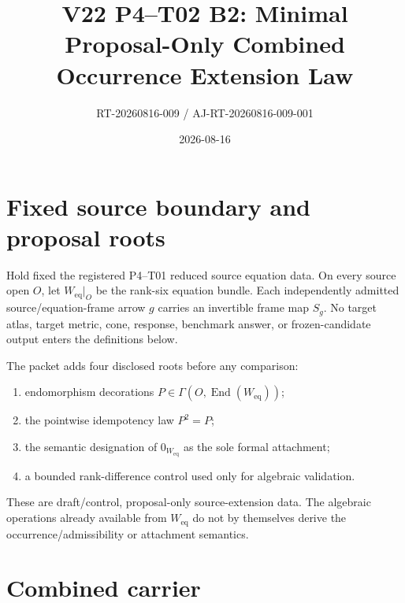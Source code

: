 \documentclass[11pt]{article}
\title{V22 P4--T02 B2: Minimal Proposal-Only Combined Occurrence Extension Law}
\author{RT-20260816-009 / AJ-RT-20260816-009-001}
\date{2026-08-16}
\newcommand{\Weq}{W_{\mathrm{eq}}}
\begin{document}
\maketitle

\begin{center}
\end{center}

\section{Fixed source boundary and proposal roots}

Hold fixed the registered P4--T01 reduced source equation data. On every source
open $O$, let $\Weq|_O$ be the rank-six equation bundle. Each independently
admitted source/equation-frame arrow $g$ carries an invertible frame map $S_g$.
No target atlas, target metric, cone, response, benchmark answer, or
frozen-candidate output enters the definitions below.

The packet adds four disclosed roots before any comparison:
\begin{enumerate}
\item endomorphism decorations $P\in\Gamma(O,\operatorname{End}(\Weq))$;
\item the pointwise idempotency law $P^2=P$;
\item the semantic designation of $0_{\Weq}$ as the sole formal attachment;
\item a bounded rank-difference control used only for algebraic validation.
\end{enumerate}
These are draft/control, proposal-only source-extension data. The algebraic
operations already available from $\Weq$ do not by themselves derive the
occurrence/admissibility or attachment semantics.

\section{Combined carrier}
\end{document}
